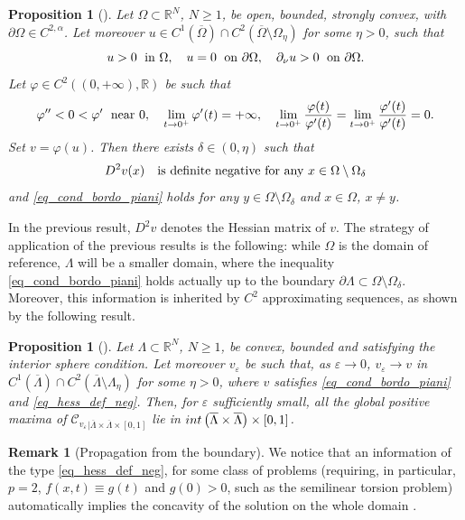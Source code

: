 \documentclass[11pt, reqno]{amsart}
\newtheorem{proposition}[lemma]{Proposition}
\theoremstyle{definition}
\newtheorem{remark}[lemma]{Remark}
\numberwithin{equation}{section}
\newcommand{\R}{\mathbb{R}}
\newcommand{\mc}[1]{\mathcal{#1}}
\def\eps{\varepsilon}
\begin{document}
\begin{proposition}[\cite{MRS24}]
\label{prop_info_bound_c2}
Let $\Omega \subset \R^N$, $N\geq 1$, be open, bounded, strongly convex, with $\partial \Omega \in C^{2,\alpha}$. 
Let moreover $u \in C^1(\overline{\Omega}) \cap C^2(\overline{\Omega} \setminus \Omega_{\eta})$ for some $\eta>0$, such that
$$u>0 \; \hbox{ in $\Omega$}, \quad u=0 \; \hbox{ on $\partial \Omega$}, \quad \partial_{\nu}u>0 \; \hbox{ on $\partial \Omega$}.$$
Let $\varphi \in C^2((0,+\infty), \R)$ be such that
$$\varphi''<0<\varphi' \; \hbox{ near $0$}, \quad \lim_{t \to 0^+} \varphi'(t)=+\infty, \quad \lim_{t \to 0^+} \frac{\varphi(t)}{\varphi'(t)} =\lim_{t\to 0^+} \frac{\varphi'(t)}{\varphi'(t)} =0.$$
Set $v=\varphi(u)$. Then there exists $\delta \in (0,\eta)$ such that
\begin{equation}\label{eq_hess_def_neg}
D^2 v(x) \quad \hbox{is definite negative for any $x\in\Omega \setminus \Omega_{\delta}$}
\end{equation}
and \eqref{eq_cond_bordo_piani} holds for any $y \in \Omega \setminus \Omega_{\delta}$ and $x \in \Omega$, $x \neq y$.
\end{proposition}

In the previous result, $D^2 v$ denotes the Hessian matrix of $v$. 
The strategy of application of the previous results is the following: while $\Omega$ is the domain of reference, $\Lambda$ will be a smaller domain, where the inequality \eqref{eq_cond_bordo_piani} holds actually up to the boundary $\partial \Lambda \subset \Omega \setminus \Omega_{\delta}$.
Moreover, this information is inherited by $C^2$ approximating sequences, as shown by the following result.

\begin{proposition}[\cite{MRS24}]
\label{prop_concav_bound_perturb}
Let $\Lambda \subset \R^N$, $N\geq 1$, be convex, bounded and satisfying the interior sphere condition.
Let moreover $v_{\eps}$ be such that, as $\eps \to 0$, $v_{\eps} \to v$ in $C^1(\overline{\Lambda}) \cap C^2(\overline{\Lambda} \setminus \Lambda_{\eta})$ for some $\eta>0$, where $v$ satisfies \eqref{eq_cond_bordo_piani} and \eqref{eq_hess_def_neg}. 
Then, for $\eps$ sufficiently small, 
all the global positive maxima of $\mc{C}_{v_{\eps}}$$_{|\overline{\Lambda} \times \overline{\Lambda} \times [0,1]}$ lie in $\textup{int}\left(\overline{\Lambda} \times \overline{\Lambda}\right)\times [0,1]$.
\end{proposition}

\begin{remark}[Propagation from the boundary]
We notice that an information of the type \eqref{eq_hess_def_neg}, for some class of problems (requiring, in particular, $p=2$, $f(x,t)\equiv g(t)$ and $g(0)>0$, such as the semilinear torsion problem) automatically implies the concavity of the solution on the whole domain \cite{KeMn93, Ste22, ChWe23}.
\end{remark}
\end{document}
